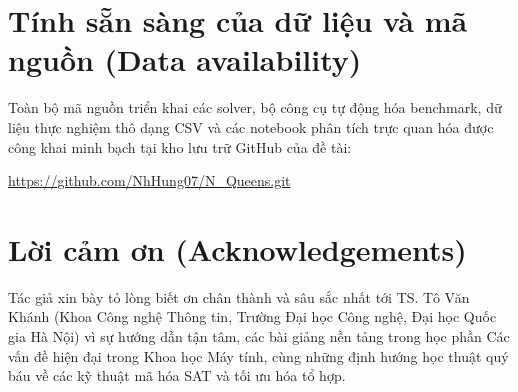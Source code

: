 \documentclass[a4paper,fleqn]{cas-sc}
\begin{document}
\section*{Tính sẵn sàng của dữ liệu và mã nguồn (Data availability)}
Toàn bộ mã nguồn triển khai các solver, bộ công cụ tự động hóa benchmark, dữ liệu thực nghiệm thô dạng CSV và các notebook phân tích trực quan hóa được công khai minh bạch tại kho lưu trữ GitHub của đề tài:
\begin{center}
\url{https://github.com/NhHung07/N_Queens.git}
\end{center}

\section*{Lời cảm ơn (Acknowledgements)}
Tác giả xin bày tỏ lòng biết ơn chân thành và sâu sắc nhất tới TS. Tô Văn Khánh (Khoa Công nghệ Thông tin, Trường Đại học Công nghệ, Đại học Quốc gia Hà Nội) vì sự hướng dẫn tận tâm, các bài giảng nền tảng trong học phần Các vấn đề hiện đại trong Khoa học Máy tính, cùng những định hướng học thuật quý báu về các kỹ thuật mã hóa SAT và tối ưu hóa tổ hợp.
\end{document}
